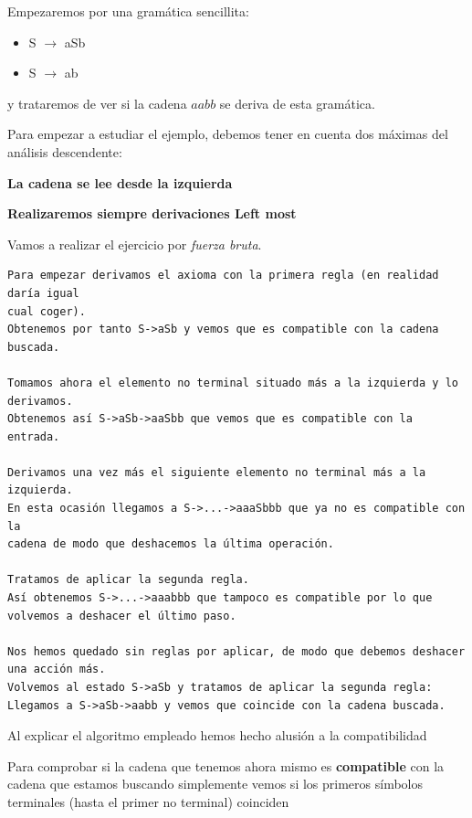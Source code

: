 \documentclass{apuntes}
\begin{document}
\newpage
\begin{example}
Empezaremos por una gramática sencillita:
\begin{itemize}
\item S $\rightarrow$ aSb
\item S $\rightarrow$ ab
\end{itemize}
y trataremos de ver si la cadena $aabb$ se deriva de esta gramática.

Para empezar a estudiar el ejemplo, debemos tener en cuenta dos máximas del análisis descendente:

\textbf{La cadena se lee desde la izquierda}

\textbf{Realizaremos siempre derivaciones Left most}

Vamos a realizar el ejercicio por \textit{fuerza bruta}.
\begin{verbatim}
Para empezar derivamos el axioma con la primera regla (en realidad daría igual
cual coger).
Obtenemos por tanto S->aSb y vemos que es compatible con la cadena buscada.

Tomamos ahora el elemento no terminal situado más a la izquierda y lo derivamos.
Obtenemos así S->aSb->aaSbb que vemos que es compatible con la entrada.

Derivamos una vez más el siguiente elemento no terminal más a la izquierda.
En esta ocasión llegamos a S->...->aaaSbbb que ya no es compatible con la
cadena de modo que deshacemos la última operación.

Tratamos de aplicar la segunda regla.
Así obtenemos S->...->aaabbb que tampoco es compatible por lo que volvemos a deshacer el último paso.

Nos hemos quedado sin reglas por aplicar, de modo que debemos deshacer una acción más.
Volvemos al estado S->aSb y tratamos de aplicar la segunda regla:
Llegamos a S->aSb->aabb y vemos que coincide con la cadena buscada.
\end{verbatim}
\end{example}

Al explicar el algoritmo empleado hemos hecho alusión a la compatibilidad

\begin{defn}[Compatibilidad]
Para comprobar si la cadena que tenemos ahora mismo es \textbf{compatible} con la cadena que estamos buscando simplemente vemos si los primeros símbolos terminales (hasta el primer no terminal) coinciden
\end{defn}
\end{document}
